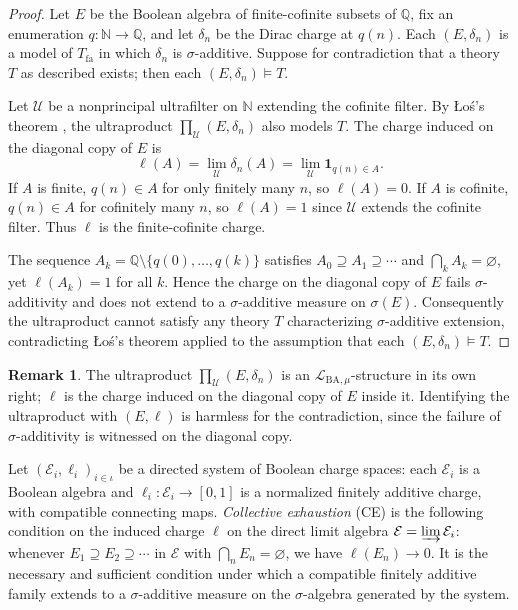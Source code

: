\documentclass[11pt]{article}
\theoremstyle{definition}
\newtheorem{remark}[proposition]{Remark}
\newcommand{\Lmu}{\mathcal{L}_{\mathrm{BA},\mu}}
\newcommand{\Tfa}{T_{\mathrm{fa}}}
\newcommand{\Q}{\mathbb{Q}}
\newcommand{\N}{\mathbb{N}}
\begin{document}
\begin{proof}
Let $E$ be the Boolean algebra of finite-cofinite subsets of $\Q$, fix an
enumeration $q : \N \to \Q$, and let $\delta_n$ be the Dirac charge at
$q(n)$.  Each $(E, \delta_n)$ is a model of $\Tfa$ in which $\delta_n$ is
$\sigma$-additive.  Suppose for contradiction that a theory $T$ as described
exists; then each $(E, \delta_n) \models T$.

Let $\mathcal{U}$ be a nonprincipal ultrafilter on $\N$ extending the cofinite
filter.  By \L{}o\'{s}'s theorem \cite{Los1955}, the ultraproduct $\prod_\mathcal{U}(E,\delta_n)$
also models $T$.  The charge induced on the diagonal copy of $E$ is
\[
  \ell(A) = \lim_\mathcal{U} \delta_n(A) = \lim_\mathcal{U} \mathbf{1}_{q(n) \in A}.
\]
If $A$ is finite, $q(n) \in A$ for only finitely many $n$, so $\ell(A) = 0$.
If $A$ is cofinite, $q(n) \in A$ for cofinitely many $n$, so $\ell(A) = 1$
since $\mathcal{U}$ extends the cofinite filter.  Thus $\ell$ is the
finite-cofinite charge.

The sequence $A_k = \Q \setminus \{q(0), \ldots, q(k)\}$ satisfies
$A_0 \supseteq A_1 \supseteq \cdots$ and $\bigcap_k A_k = \varnothing$, yet
$\ell(A_k) = 1$ for all $k$.  Hence the charge on the diagonal copy of $E$
fails $\sigma$-additivity and does not extend to a $\sigma$-additive measure
on $\sigma(E)$.  Consequently the ultraproduct cannot satisfy any theory $T$
characterizing $\sigma$-additive extension, contradicting \L{}o\'{s}'s theorem
applied to the assumption that each $(E, \delta_n) \models T$.
\end{proof}

\begin{remark}
The ultraproduct $\prod_\mathcal{U}(E,\delta_n)$ is an $\Lmu$-structure in its own
right; $\ell$ is the charge induced on the diagonal copy of $E$ inside it.
Identifying the ultraproduct with $(E,\ell)$ is harmless for the contradiction,
since the failure of $\sigma$-additivity is witnessed on the diagonal copy.
\end{remark}

\medskip

Let $(\mathcal{E}_i, \ell_i)_{i \in \iota}$ be a directed system of Boolean charge
spaces: each $\mathcal{E}_i$ is a Boolean algebra and $\ell_i : \mathcal{E}_i \to [0,1]$
is a normalized finitely additive charge, with compatible connecting maps.
\emph{Collective exhaustion} (CE) is the following condition on the induced charge
$\ell$ on the direct limit algebra $\mathcal{E} = \varinjlim \mathcal{E}_i$: whenever
$E_1 \supseteq E_2 \supseteq \cdots$ in $\mathcal{E}$ with $\bigcap_n E_n = \varnothing$,
we have $\ell(E_n) \to 0$.  It is the necessary and sufficient condition under which
a compatible finitely additive family extends to a $\sigma$-additive measure on the
$\sigma$-algebra generated by the system.
\end{document}
